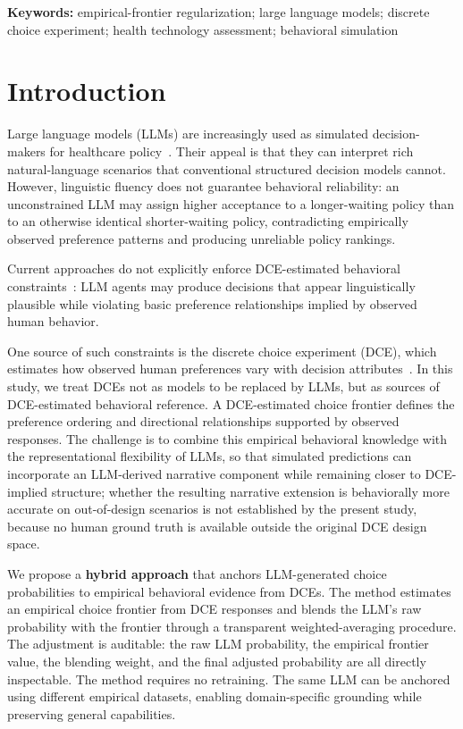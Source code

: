 \documentclass[11pt]{article}
\newcommand{\keywords}[1]{\vspace{0.5em}\noindent\textbf{Keywords:} #1}
\begin{document}
\keywords{empirical-frontier regularization; large language models; discrete choice experiment; health technology assessment; behavioral simulation}

\clearpage
\section{Introduction}
\label{sec:intro}

Large language models (LLMs) are increasingly used as simulated decision-makers for healthcare policy~\citep{Park2023a, Mu2024, VonHoene2025}. Their appeal is that they can interpret rich natural-language scenarios that conventional structured decision models cannot. However, linguistic fluency does not guarantee behavioral reliability: an unconstrained LLM may assign higher acceptance to a longer-waiting policy than to an otherwise identical shorter-waiting policy, contradicting empirically observed preference patterns and producing unreliable policy rankings.

Current approaches do not explicitly enforce DCE-estimated behavioral constraints~\citep{Aher2022TuringExperiments, Horton2023, santurkar2023whose}: LLM agents may produce decisions that appear linguistically plausible while violating basic preference relationships implied by observed human behavior.

One source of such constraints is the discrete choice experiment (DCE), which estimates how observed human preferences vary with decision attributes~\citep{Chan2024}. In this study, we treat DCEs not as models to be replaced by LLMs, but as sources of DCE-estimated behavioral reference. A DCE-estimated choice frontier defines the preference ordering and directional relationships supported by observed responses. The challenge is to combine this empirical behavioral knowledge with the representational flexibility of LLMs, so that simulated predictions can incorporate an LLM-derived narrative component while remaining closer to DCE-implied structure; whether the resulting narrative extension is behaviorally more accurate on out-of-design scenarios is not established by the present study, because no human ground truth is available outside the original DCE design space.

We propose a \textbf{hybrid approach} that anchors LLM-generated choice probabilities to empirical behavioral evidence from DCEs. The method estimates an empirical choice frontier from DCE responses and blends the LLM's raw probability with the frontier through a transparent weighted-averaging procedure. The adjustment is auditable: the raw LLM probability, the empirical frontier value, the blending weight, and the final adjusted probability are all directly inspectable. The method requires no retraining. The same LLM can be anchored using different empirical datasets, enabling domain-specific grounding while preserving general capabilities.
\end{document}
